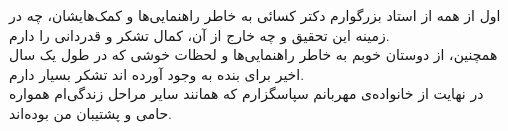 


اول از همه از استاد بزرگوارم دکتر کسائی به خاطر راهنمایی‌ها و کمک‌هایشان، چه در زمینه این تحقیق و چه خارج از آن، کمال تشکر و قدردانی را دارم. \\

همچنین، از دوستان خوبم به خاطر راهنمایی‌ها و لحظات خوشی که در طول یک سال اخیر برای بنده به وجود آورده اند تشکر بسیار دارم. \\

در نهایت از خانواده‌ی مهربانم سپاسگزارم که همانند سایر مراحل زندگی‌ام همواره حامی و پشتیبان من بوده‌اند.


\pagebreak
